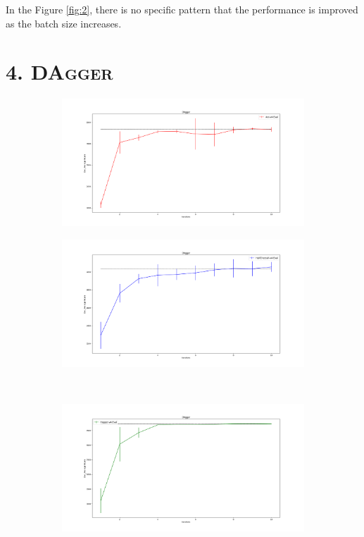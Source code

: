 \documentclass{article}%
\begin{document}
In the Figure \ref{fig:2}, there is no specific pattern that the performance is improved as the batch size increases.

\newpage
\section*{4. \textsc{DAgger}}

\begin{figure}[h]
	\centering
	\begin{subfigure}{0.48\textwidth}
			\includegraphics[width=\textwidth]{hw1_4_ant-v4.png}
	\end{subfigure}
	\begin{subfigure}{0.48\textwidth}
			\includegraphics[width=\textwidth]{hw1_4_halfcheetah-v4.png}
	\end{subfigure}
	\\
	\begin{subfigure}{0.48\textwidth}
			\includegraphics[width=\textwidth]{hw1_4_hopper-v4.png}

\end{subfigure}
\end{figure}
\end{document}
